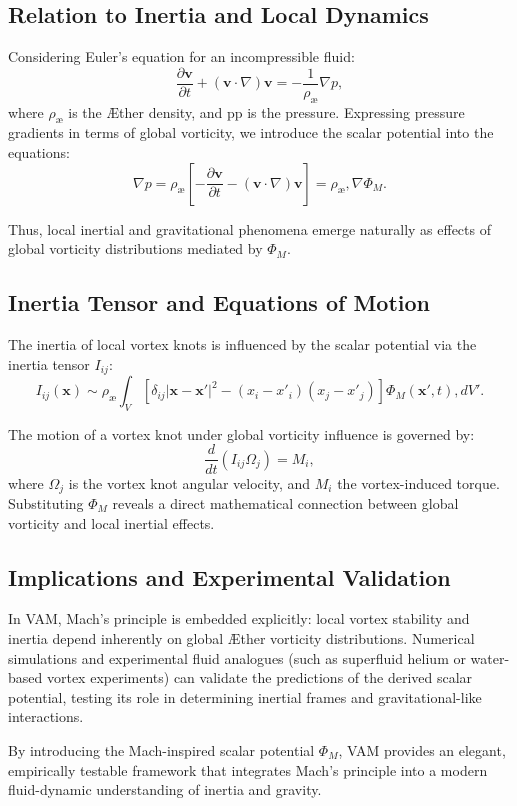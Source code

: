 \subsection{Relation to Inertia and Local Dynamics}
Considering Euler's equation for an incompressible fluid:
\begin{equation}
    \frac{\partial \mathbf{v}}{\partial t}+(\mathbf{v}\cdot \nabla)\mathbf{v}=-\frac{1}{\rho_\text{\ae}}\nabla p,
\end{equation}
where $\rho_\text{\ae}$ is the Æther density, and pp is the pressure. Expressing pressure gradients in terms of global vorticity, we introduce the scalar potential into the equations:
\begin{equation}
    \nabla p = \rho_\text{\ae}\left[-\frac{\partial\mathbf{v}}{\partial t} - (\mathbf{v}\cdot\nabla)\mathbf{v}\right] = \rho_\text{\ae}, \nabla \Phi_M.
\end{equation}


Thus, local inertial and gravitational phenomena emerge naturally as effects of global vorticity distributions mediated by $\Phi_M$.


\subsection{Inertia Tensor and Equations of Motion}
The inertia of local vortex knots is influenced by the scalar potential via the inertia tensor $I_{ij}$:
\begin{equation}
    I_{ij}(\mathbf{x}) \sim \rho_\text{\ae}\int_V \left[\delta_{ij}|\mathbf{x}-\mathbf{x}'|^2 - (x_i - x'_i)(x_j - x'_j)\right]\Phi_M(\mathbf{x}',t), dV'.
\end{equation}


The motion of a vortex knot under global vorticity influence is governed by:
\begin{equation}
    \frac{d}{dt}(I_{ij}\Omega_j) = M_i,
\end{equation}
where $\Omega_j$ is the vortex knot angular velocity, and $M_i$ the vortex-induced torque. Substituting $\Phi_M$ reveals a direct mathematical connection between global vorticity and local inertial effects.


\subsection{Implications and Experimental Validation}
In VAM, Mach's principle is embedded explicitly: local vortex stability and inertia depend inherently on global Æther vorticity distributions. Numerical simulations and experimental fluid analogues (such as superfluid helium or water-based vortex experiments) can validate the predictions of the derived scalar potential, testing its role in determining inertial frames and gravitational-like interactions.


By introducing the Mach-inspired scalar potential $\Phi_M$, VAM provides an elegant, empirically testable framework that integrates Mach's principle into a modern fluid-dynamic understanding of inertia and gravity.